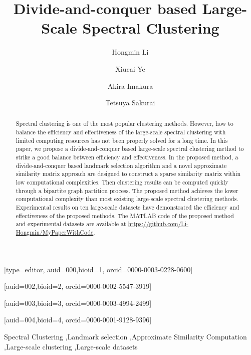 \documentclass[a4paper,fleqn]{cas-dc}
\begin{document}
\let\WriteBookmarks\relax
\def\floatpagepagefraction{1}
\def\textpagefraction{.001}

\title [mode = title]{Divide-and-conquer based Large-Scale Spectral Clustering}



\author{Hongmin Li}[type=editor,
                        auid=000,bioid=1,
orcid=0000-0003-0228-0600]
\cormark[1]


\address{Department of Computer Science, University of Tsukuba, Tsukuba, Ibaraki 305-8577, Japan}

\author{Xiucai Ye}[auid=002,bioid=2,
orcid=0000-0002-5547-3919]
\author{Akira Imakura}[auid=003,bioid=3,
orcid=0000-0003-4994-2499]
\author{Tetsuya Sakurai}[auid=004,bioid=4,
orcid=0000-0001-9128-9396]


\begin{abstract}
        Spectral clustering is one of the most popular clustering methods. 
        However, how to balance the efficiency and effectiveness of the large-scale spectral clustering with limited computing resources has not been properly solved for a long time.
        In this paper, we propose a divide-and-conquer based large-scale spectral clustering method to strike a good balance between efficiency and effectiveness.
        In the proposed method, a divide-and-conquer based landmark selection algorithm and a novel approximate similarity matrix approach are designed to construct a sparse similarity matrix within low computational complexities. Then clustering results can be computed quickly through a 
        bipartite graph partition process. 
        The proposed method achieves the lower computational complexity than most existing large-scale spectral clustering methods.
        Experimental results on ten large-scale datasets have demonstrated the efficiency and effectiveness of the proposed methods.
        The MATLAB code of the proposed method and experimental datasets are available at \url{https://github.com/Li-Hongmin/MyPaperWithCode}.

\end{abstract}

\begin{keywords}
Spectral Clustering  \sep Landmark selection \sep Approximate Similarity Computation \sep Large-scale clustering \sep Large-scale datasets
\end{keywords}
\end{document}
